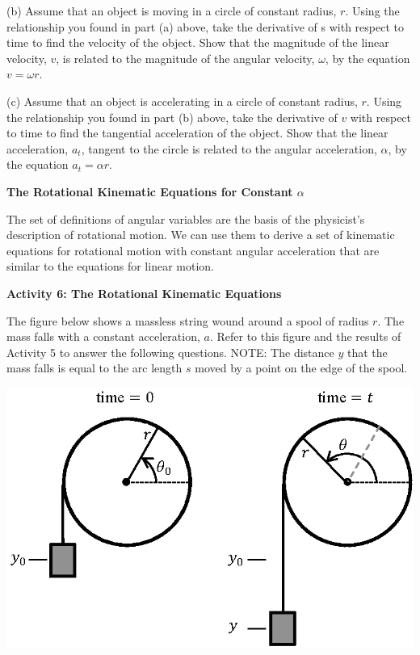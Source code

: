 (b) Assume that an object is moving in a circle of constant radius, $r$. Using the relationship you found in part (a) above, take the derivative of s with respect to time to find the velocity of the object. Show that the magnitude of the linear velocity, $v$, is related to the magnitude of the angular velocity,
\( \omega  \), by the equation \(v =  \omega r \).
\vspace{20mm}

(c) Assume that an object is accelerating in a circle of constant radius, $r$.
Using the relationship you found in part (b) above, take the derivative of $v$ with respect to time to find the tangential acceleration of the object. Show that the linear acceleration, \( a_{t} \), tangent to the circle is related to the angular acceleration, \( \alpha  \), by the equation \( a_{t}  =  \alpha  r\).
\vspace{20mm}

\pagebreak[3]

\textbf{The Rotational Kinematic Equations for Constant \( \alpha  \) }

The set of definitions of angular variables are the basis of the physicist's
description of rotational motion. We can use them to derive a set of kinematic
equations for rotational motion with constant angular acceleration that are
similar to the equations for linear motion. 


\textbf{Activity 6: The Rotational Kinematic Equations }

The figure below shows a massless string wound around a spool of radius $r$.
The mass falls with a constant acceleration, $a$. Refer to this figure and the 
results of Activity 5 to answer the following questions. NOTE: The distance 
$y$ that the mass falls is equal to the arc length $s$ moved by a point on the 
edge of the spool.

\vspace{0.3cm}
{\par\centering \includegraphics[scale=0.9]{rotation/rotation_fig9_new.eps} \par}
\vspace{0.3cm}

